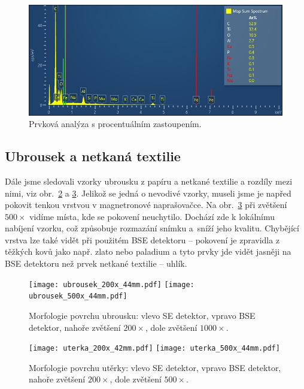 \documentclass[a4paper,12pt]{article}
\begin{document}
\begin{figure}[h!]
	\centering
	\includegraphics[width=\textwidth]{Map Sum Spectrum.jpeg}
	\caption{\centering Prvková analýza s procentuálním zastoupením.}
	\label{fig:spectrum}
\end{figure}

\subsection{Ubrousek a netkaná textilie}\noindent
Dále jsme sledovali vzorky ubrousku z papíru a netkané textilie a rozdíly mezi 
nimi, viz obr.~\ref{fig:ubrousek} a \ref{fig:uterka}. Jelikož se 
jedná o nevodivé vzorky, museli jsme je napřed pokovit tenkou vrstvou v 
magnetronové naprašovačce. Na obr.~\ref{fig:uterka} při zvětšení $500\times$ 
vidíme místa, kde se pokovení neuchytilo. Dochází zde k lokálnímu nabíjení 
vzorku, což způsobuje rozmazání snímku a~sníží jeho kvalitu. Chybějící vrstva 
lze také 
vidět při použitém BSE 
detektoru -- pokovení je zpravidla z těžkých kovů jako např. zlato nebo 
paladium a 
tyto prvky jde vidět jasněji na BSE detektoru než prvek netkané textilie -- 
uhlík.

\begin{figure}[h!]
	\centering
	\texttt{[image: ubrousek\_200x\_44mm.pdf]}
	\texttt{[image: ubrousek\_500x\_44mm.pdf]}
	\caption{\centering Morfologie povrchu ubrousku: vlevo SE detektor, vpravo 
	BSE 
		detektor, nahoře zvětšení $200\times$, dole zvětšení $1000\times$.}
	\label{fig:ubrousek}
\end{figure}

\begin{figure}[h!]
	\centering
	\texttt{[image: uterka\_200x\_42mm.pdf]}
	\texttt{[image: uterka\_500x\_44mm.pdf]}
	\caption{\centering Morfologie povrchu utěrky: vlevo SE detektor, vpravo 
	BSE detektor, nahoře zvětšení $200\times$, dole zvětšení $500\times$.}
	\label{fig:uterka}
\end{figure}
\end{document}
